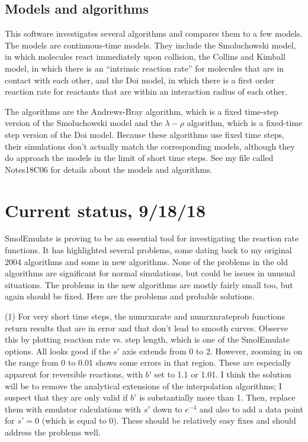 \documentclass {book}
\begin{document}
\section{Models and algorithms}

This software investigates several algorithms and compares them to a few models. The models are continuous-time models. They include the Smoluchowski model, in which molecules react immediately upon collision, the Collins and Kimball model, in which there is an ``intrinsic reaction rate'' for molecules that are in contact with each other, and the Doi model, in which there is a first order reaction rate for reactants that are within an interaction radius of each other.

The algorithms are the Andrews-Bray algorithm, which is a fixed time-step version of the Smoluchowski model and the $\lambda - \rho$ algorithm, which is a fixed-time step version of the Doi model. Because these algorithms use fixed time steps, their simulations don't actually match the corresponding models, although they do approach the models in the limit of short time steps. See my file called Notes18C06 for details about the models and algorithms.

\chapter{Current status, 9/18/18}

SmolEmulate is proving to be an essential tool for investigating the reaction rate functions. It has highlighted several problems, some dating back to my original 2004 algorithms and some in new algorithms. None of the problems in the old algorithms are significant for normal simulations, but could be issues in unusual situations. The problems in the new algorithms are mostly fairly small too, but again should be fixed. Here are the problems and probable solutions.

(1) For very short time steps, the numrxnrate and numrxnrateprob functions return results that are in error and that don't lead to smooth curves. Observe this by plotting reaction rate vs. step length, which is one of the SmolEmulate options. All looks good if the $s'$ axis extends from 0 to 2. However, zooming in on the range from 0 to 0.01 shows some errors in that region. These are especially apparent for reversible reactions, with $b'$ set to 1.1 or 1.01. I think the solution will be to remove the analytical extensions of the interpolation algorithms; I suspect that they are only valid if $b'$ is substantially more than 1. Then, replace them with emulator calculations with $s'$ down to $e^{-4}$ and also to add a data point for $s'=0$ (which is equal to 0). These should be relatively easy fixes and should address the problems well.
\end{document}
